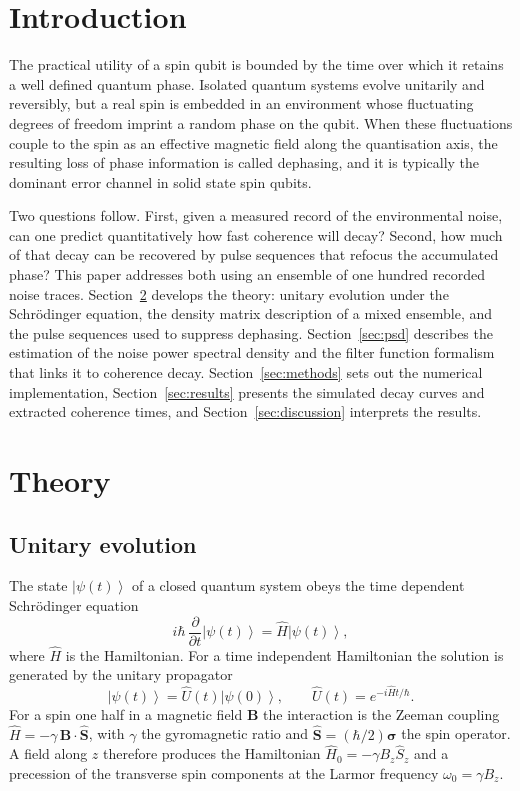 \documentclass[conference]{IEEEtran}
\newcommand{\ket}[1]{\left|#1\right\rangle}
\begin{document}
\section{Introduction}

The practical utility of a spin qubit is bounded by the time over which it
retains a well defined quantum phase. Isolated quantum systems evolve unitarily
and reversibly, but a real spin is embedded in an environment whose fluctuating
degrees of freedom imprint a random phase on the qubit. When these fluctuations
couple to the spin as an effective magnetic field along the quantisation axis,
the resulting loss of phase information is called dephasing, and it is typically
the dominant error channel in solid state spin qubits.

Two questions follow. First, given a measured record of the environmental noise,
can one predict quantitatively how fast coherence will decay? Second, how much of
that decay can be recovered by pulse sequences that refocus the accumulated
phase? This paper addresses both using an ensemble of one hundred recorded noise
traces. Section~\ref{sec:theory} develops the theory: unitary evolution under the
Schr\"odinger equation, the density matrix description of a mixed ensemble, and
the pulse sequences used to suppress dephasing. Section~\ref{sec:psd} describes
the estimation of the noise power spectral density and the filter function
formalism that links it to coherence decay. Section~\ref{sec:methods} sets out
the numerical implementation, Section~\ref{sec:results} presents the simulated
decay curves and extracted coherence times, and Section~\ref{sec:discussion}
interprets the results.

\section{Theory}\label{sec:theory}

\subsection{Unitary evolution}

The state $\ket{\psi(t)}$ of a closed quantum system obeys the time dependent
Schr\"odinger equation
\begin{equation}
i\hbar\,\frac{\partial}{\partial t}\ket{\psi(t)} = \hat{H}\ket{\psi(t)},
\label{eq:tdse}
\end{equation}
where $\hat{H}$ is the Hamiltonian. For a time independent Hamiltonian the
solution is generated by the unitary propagator
\begin{equation}
\ket{\psi(t)} = \hat{U}(t)\ket{\psi(0)}, \qquad
\hat{U}(t) = e^{-i\hat{H}t/\hbar}.
\label{eq:propagator}
\end{equation}
For a spin one half in a magnetic field $\mathbf{B}$ the interaction is the
Zeeman coupling $\hat{H} = -\gamma\,\mathbf{B}\cdot\hat{\mathbf{S}}$, with
$\gamma$ the gyromagnetic ratio and $\hat{\mathbf{S}} = (\hbar/2)\boldsymbol{\sigma}$
the spin operator. A field along $z$ therefore produces the Hamiltonian
$\hat{H}_0 = -\gamma B_z \hat{S}_z$ and a precession of the transverse spin
components at the Larmor frequency $\omega_0 = \gamma B_z$.
\end{document}
